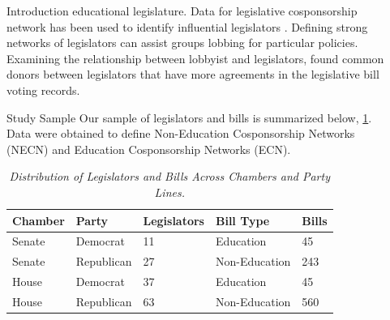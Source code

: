 \documentclass[final]{beamer}
\newlength{\sepwid}
\newlength{\onecolwid}
\begin{document}
\begin{frame}[t]
\begin{columns}[t]
\begin{column}{\onecolwid}
\begin{block}{Introduction}
					educational legislature.  Data for legislative cosponsorship network has been used to identify 
					influential legislators \parencite{fowler2006}.  Defining strong networks of legislators can assist 
					groups lobbing for particular policies.  Examining the relationship between lobbyist and 
					legislators, \textcite{kroger2009} found common donors between legislators that have more agreements 
					in the legislative bill voting records.
				\end{block}
				\begin{block}{Study Sample}
					Our sample of legislators and bills is summarized below, \ref{sample}.  Data were obtained to define
					Non-Education Cosponsorship Networks (NECN) and Education Cosponsorship Networks (ECN).
					
					\begin{table}
						\caption{\textit{Distribution of Legislators and Bills Across Chambers and Party Lines.} \label{sample}}
						\begin{tabular}{l l l || l l}
							\toprule
							\textbf{Chamber} & \textbf{Party} & \textbf{Legislators} & \textbf{Bill Type} & \textbf{Bills} \\
							\midrule
							Senate & Democrat & 11 & Education & 45 \\
							Senate & Republican & 27 & Non-Education & 243 \\
							House & Democrat & 37 & Education & 45 \\
							House & Republican & 63 & Non-Education & 560 \\
							\bottomrule
						\end{tabular}
					\end{table}
										
				\end{block}
			\end{column} %

			\begin{column}{\sepwid}\end{column} %
			

\end{columns}
\end{frame}
\end{document}
